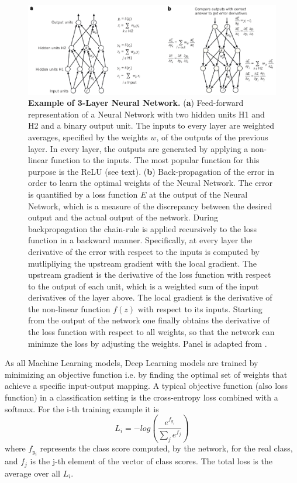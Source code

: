\begin{figure}[h!]
	\centering
	\captionsetup{width=1\linewidth}
	\includegraphics[width=1\textwidth]{Figures/simple_neural_net.pdf}
	\caption{\textbf{Example of 3-Layer Neural Network.} (\textbf{a}) Feed-forward representation of a Neural Network with two hidden units H1 and H2 and a binary output unit. The inputs to every layer are weighted averages, specified by the weights $w$, of the outputs of the previous layer. In every layer, the outputs are generated by applying a non-linear function to the inputs. The most popular function for this purpose is the ReLU (see text). (\textbf{b}) Back-propagation of the error in order to learn the optimal weights of the Neural Network. The error is quantified by a loss function $E$ at the output of the Neural Network, which is a measure of the discrepancy between the desired output and the actual output of the network. During backpropagation the chain-rule is applied recursively to the loss function in a backward manner. Specifically, at every layer the derivative of the error with respect to the inputs is computed by mutlipliying the upstream gradient with the local gradient. The upstream gradient is the derivative of the loss function with respect to the output of each unit, which is a weighted sum of the input derivatives of the layer above. The local gradient is the derivative of the non-linear function $f(z)$ with respect to its inputs. Starting from the output of the network one finally obtains the derivative of the loss function with respect to all weights, so that the network can minimze the loss by adjusting the weights. Panel is adapted from \parencite{lecun2015}.}
	\label{fig:simple_neural_net}
\end{figure}

As all Machine Learning models, Deep Learning models are trained by minimizing an objective function i.e. by finding the optimal set of weights that achieve a specific input-output mapping. A typical objective function (also loss function) in a classification setting is the cross-entropy loss combined with a softmax. For the i-th training example it is
$$
L_i = -log\left(\frac{e^{f_{y_i}}}{\sum_j e^{f_j}}\right)
$$
where $f_{y_i}$ represents the class score computed, by the network, for the real class, and $f_j$ is the j-th element of the vector of class scores. The total loss is the average over all $L_i$. 

